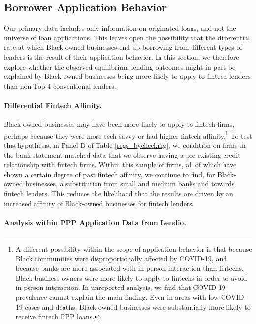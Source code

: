 \documentclass[11pt]{article}
\begin{document}
\subsection{Borrower Application Behavior}

Our primary data includes only information on originated loans, and not the universe of loan applications. This leaves open the possibility that the differential rate at which Black-owned businesses end up borrowing from different types of lenders is the result of their application behavior. In this section, we therefore explore whether the observed equilibrium lending outcomes might in part be explained by Black-owned businesses being more likely to apply to fintech lenders than non-Top-4 conventional lenders.

\paragraph{Differential Fintech Affinity.}

Black-owned businesses may have been more likely to apply to fintech firms, perhaps because they were more tech savvy or had higher fintech affinity.\footnote{A different possibility within the scope of application behavior is that because Black communities were disproportionally affected by COVID-19, and because banks are more associated with in-person interaction than fintechs, Black business owners were more likely to apply to fintechs in order to avoid in-person interaction. In unreported analysis, we find that COVID-19 prevalence cannot explain the main finding. Even in areas with low COVID-19 cases and deaths, Black-owned businesses were substantially more likely to receive fintech PPP loans.} To test this hypothesis, in Panel D of Table \ref{regs_bychecking}, we condition on firms in the bank statement-matched data that we observe having a pre-existing credit relationship with fintech firms. Within this sample of firms, all of which have shown a certain degree of past fintech affinity, we continue to find, for Black-owned businesses, a substitution from small and medium banks and towards fintech lenders. This reduces the likelihood that the results are driven by an increased affinity of Black-owned businesses for fintech lenders.  

\paragraph{Analysis within PPP Application Data from Lendio.}
\end{document}

